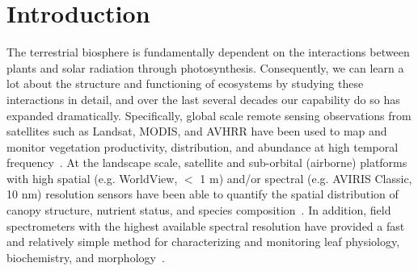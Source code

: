 \section{Introduction}\label{sec:pecanrtm-intro}

The terrestrial biosphere is fundamentally dependent on the interactions between plants and solar radiation through photosynthesis.
Consequently, we can learn a lot about the structure and functioning of ecosystems by studying these interactions in detail, and over the last several decades our capability do so has expanded dramatically.
Specifically, global scale remote sensing observations from satellites such as Landsat, MODIS, and AVHRR have been used to map and monitor vegetation productivity, distribution, and abundance at high temporal frequency~\cite{loveland_2000_development,friedl_2002_global,hansen_2010_quantification,houborg_2015_advances}.
At the landscape scale, satellite and sub-orbital (airborne) platforms with high spatial (e.g. WorldView, $<$ 1 m) and/or spectral (e.g. AVIRIS Classic, 10 nm) resolution sensors have been able to quantify the spatial distribution of canopy structure, nutrient status, and species composition~\cite{asner_2015_quantifying,banskota_2015_inversion,singh_imaging_2015}.
In addition, field spectrometers with the highest available spectral resolution have provided a fast and relatively simple method for characterizing and monitoring leaf physiology, biochemistry, and morphology~\cite{serbin_2012_spectroscopic,couture_2013_spectroscopic,sullivan_2013_foliar,serbin_spectroscopic_2014,zhao_2014_early}.

